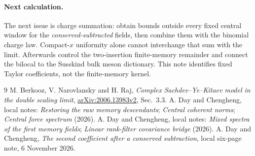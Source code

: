 \documentclass[11pt,a4paper]{article}
\begin{document}
\paragraph{Next calculation.}
The next issue is charge summation: obtain bounds outside every
fixed central window for the \emph{conserved-subtracted} fields,
then combine them with the binomial charge law. Compact-$x$
uniformity alone cannot interchange that sum with the limit.
Afterwards control the two-insertion finite-memory remainder and
connect the bilocal to the Susskind bulk meson dictionary. This
note identifies fixed Taylor coefficients, not the finite-memory kernel.

\begin{thebibliography}{9}\small
{} M. Berkooz, V. Narovlansky and H. Raj,
\emph{Complex Sachdev--Ye--Kitaev model in the double scaling limit},
\href{https://arxiv.org/html/2006.13983v2}{arXiv:2006.13983v2}, Sec.~3.3.
 A. Day and Chengheng, local notes:
\emph{Restoring the raw memory descendants};
\emph{Central coherent norms}; \emph{Central force spectrum} (2026).
 A. Day and Chengheng, local notes:
\emph{Mixed spectra of the first memory fields};
\emph{Linear rank-filter covariance bridge} (2026).
 A. Day and Chengheng,
\emph{The second coefficient after a conserved subtraction},
local six-page note, 6 November 2026.
\end{thebibliography}
\end{document}
